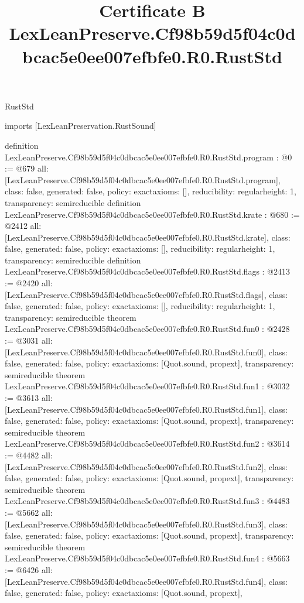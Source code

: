 \begin{lexlean}{RustStd}
\title{Certificate B LexLeanPreserve.Cf98b59d5f04c0dbcac5e0ee007efbfe0.R0.RustStd}
\begin{coremodule}
imports [LexLeanPreservation.RustSound]

definition LexLeanPreserve.Cf98b59d5f04c0dbcac5e0ee007efbfe0.R0.RustStd.program : @0 := @679 {
  all: [LexLeanPreserve.Cf98b59d5f04c0dbcac5e0ee007efbfe0.R0.RustStd.program],
  class: false,
  generated: false,
  policy: exact{axioms: []},
  reducibility: regular{height: 1},
  transparency: semireducible
}
definition LexLeanPreserve.Cf98b59d5f04c0dbcac5e0ee007efbfe0.R0.RustStd.krate : @680 := @2412 {
  all: [LexLeanPreserve.Cf98b59d5f04c0dbcac5e0ee007efbfe0.R0.RustStd.krate],
  class: false,
  generated: false,
  policy: exact{axioms: []},
  reducibility: regular{height: 1},
  transparency: semireducible
}
definition LexLeanPreserve.Cf98b59d5f04c0dbcac5e0ee007efbfe0.R0.RustStd.flags : @2413 := @2420 {
  all: [LexLeanPreserve.Cf98b59d5f04c0dbcac5e0ee007efbfe0.R0.RustStd.flags],
  class: false,
  generated: false,
  policy: exact{axioms: []},
  reducibility: regular{height: 1},
  transparency: semireducible
}
theorem LexLeanPreserve.Cf98b59d5f04c0dbcac5e0ee007efbfe0.R0.RustStd.fun0 : @2428 := @3031 {
  all: [LexLeanPreserve.Cf98b59d5f04c0dbcac5e0ee007efbfe0.R0.RustStd.fun0],
  class: false,
  generated: false,
  policy: exact{axioms: [Quot.sound, propext]},
  transparency: semireducible
}
theorem LexLeanPreserve.Cf98b59d5f04c0dbcac5e0ee007efbfe0.R0.RustStd.fun1 : @3032 := @3613 {
  all: [LexLeanPreserve.Cf98b59d5f04c0dbcac5e0ee007efbfe0.R0.RustStd.fun1],
  class: false,
  generated: false,
  policy: exact{axioms: [Quot.sound, propext]},
  transparency: semireducible
}
theorem LexLeanPreserve.Cf98b59d5f04c0dbcac5e0ee007efbfe0.R0.RustStd.fun2 : @3614 := @4482 {
  all: [LexLeanPreserve.Cf98b59d5f04c0dbcac5e0ee007efbfe0.R0.RustStd.fun2],
  class: false,
  generated: false,
  policy: exact{axioms: [Quot.sound, propext]},
  transparency: semireducible
}
theorem LexLeanPreserve.Cf98b59d5f04c0dbcac5e0ee007efbfe0.R0.RustStd.fun3 : @4483 := @5662 {
  all: [LexLeanPreserve.Cf98b59d5f04c0dbcac5e0ee007efbfe0.R0.RustStd.fun3],
  class: false,
  generated: false,
  policy: exact{axioms: [Quot.sound, propext]},
  transparency: semireducible
}
theorem LexLeanPreserve.Cf98b59d5f04c0dbcac5e0ee007efbfe0.R0.RustStd.fun4 : @5663 := @6426 {
  all: [LexLeanPreserve.Cf98b59d5f04c0dbcac5e0ee007efbfe0.R0.RustStd.fun4],
  class: false,
  generated: false,
  policy: exact{axioms: [Quot.sound, propext]},
}
\end{coremodule}
\end{lexlean}
